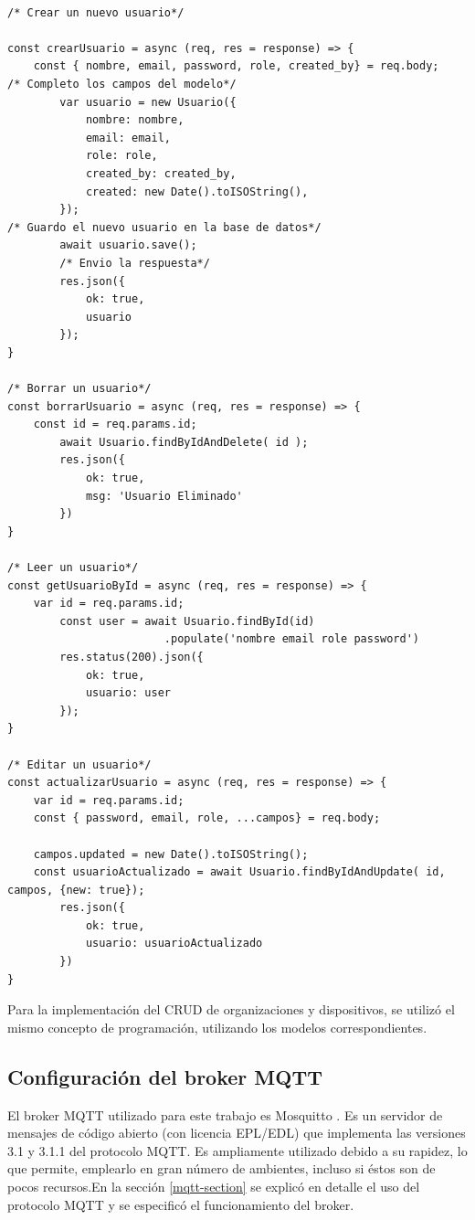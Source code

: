 \begin{lstlisting}[label=cod:crud-usuario,caption=Implementación CRUD para usuarios que se registran.] 

/* Crear un nuevo usuario*/

const crearUsuario = async (req, res = response) => {
    const { nombre, email, password, role, created_by} = req.body;  
/* Completo los campos del modelo*/
        var usuario = new Usuario({
            nombre: nombre,
            email: email,
            role: role,
            created_by: created_by,
            created: new Date().toISOString(),      
        });
/* Guardo el nuevo usuario en la base de datos*/
        await usuario.save();
        /* Envio la respuesta*/
        res.json({
            ok: true,
            usuario
        });   
}

/* Borrar un usuario*/
const borrarUsuario = async (req, res = response) => {
    const id = req.params.id;
        await Usuario.findByIdAndDelete( id );
        res.json({
            ok: true,
            msg: 'Usuario Eliminado'
        })
}

/* Leer un usuario*/
const getUsuarioById = async (req, res = response) => {
    var id = req.params.id;
        const user = await Usuario.findById(id)
                        .populate('nombre email role password')
        res.status(200).json({
            ok: true,
            usuario: user
        });
}

/* Editar un usuario*/
const actualizarUsuario = async (req, res = response) => {
    var id = req.params.id;
    const { password, email, role, ...campos} = req.body;

    campos.updated = new Date().toISOString();
    const usuarioActualizado = await Usuario.findByIdAndUpdate( id, campos, {new: true});
        res.json({
            ok: true,
            usuario: usuarioActualizado
        })
}

\end{lstlisting}


Para la implementación del CRUD de organizaciones y dispositivos, se utilizó el mismo concepto de programación, utilizando los modelos correspondientes. 


\subsection{Configuración del broker MQTT}
\label{mqtt-sec}

El broker MQTT utilizado para este trabajo es Mosquitto \citep{WEBSITE:39}. Es un servidor de mensajes de código abierto (con licencia EPL/EDL) que implementa las versiones 3.1 y 3.1.1 del protocolo MQTT. Es ampliamente utilizado debido a su rapidez, lo que permite, emplearlo en gran número de ambientes, incluso si éstos son de pocos recursos.En la sección \ref{mqtt-section} se explicó en detalle el uso del protocolo MQTT y se especificó el funcionamiento del broker. 

